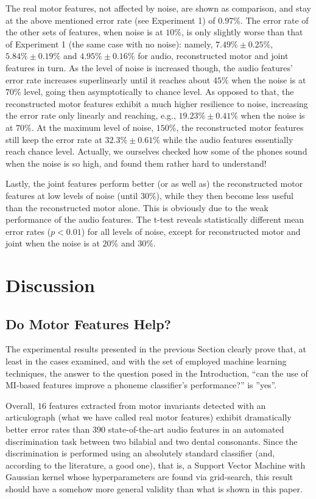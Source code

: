 \documentclass{pnastwo}
\begin{document}
\begin{article}
The real motor features, not affected by noise, are shown as comparison, and stay at
the above mentioned error rate (see Experiment 1) of $0.97\%$. The error rate of the
other sets of features, when noise is at $10\%$, is only slightly worse than that of
Experiment 1 (the same case with no noise): namely,
$7.49\% \pm 0.25\%$, 
$5.84\% \pm 0.19\%$ and 
$4.95\% \pm 0.16\%$ for audio, reconstructed motor and joint features in turn.
As the level of noise is increased though, the audio features' error rate
increases superlinearly until it reaches about $45\%$ when the noise is at $70\%$
level, going then asymptotically to chance level. As opposed to that, the reconstructed
motor features exhibit a much higher resilience to noise, increasing the error rate
only linearly and reaching, e.g., $19.23\% \pm 0.41\%$ when the noise is at $70\%$.
At the maximum level of noise, $150\%$, the reconstructed motor features still keep
the error rate at $32.3\% \pm 0.61\%$ while the audio features essentially reach chance
level. Actually, we ourselves checked how some of the phones sound when the noise is
so high, and found them rather hard to understand!

Lastly, the joint features perform better (or as well as) the reconstructed motor features
at low levels of noise (until $30\%$), while they then become less useful than the
reconstructed motor alone. This is obviously due to the weak performance of the audio
features.
The t-test reveals statistically different mean error rates ($p<0.01$) for all levels of
noise, except for reconstructed motor and joint when the noise is at $20\%$
and $30\%$.

\section{Discussion}
\label{sec:disc}

\subsection{Do Motor Features Help?}

The experimental results presented in the previous Section clearly prove that,
at least in the cases examined, and with the set of employed machine learning techniques,
the answer to the question posed in the Introduction, ``can the use of MI-based
features improve a phoneme classifier's performance?'' is ''yes''.

Overall, $16$ features extracted from motor invariants detected with an articulograph
(what we have called real motor features) exhibit dramatically better error rates
than $390$ state-of-the-art audio features in an automated discrimination task between
two bilabial and two dental consonants. Since the discrimination is performed using an
absolutely standard classifier (and, according to the literature, a good one), that is,
a Support Vector Machine with Gaussian kernel whose hyperparameters are found via
grid-search, this result should have a somehow more general validity than what is shown
in this paper.


\end{article}
\end{document}
